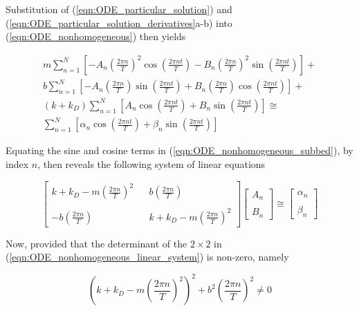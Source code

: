 \noindent Substitution of (\ref{eqn:ODE_particular_solution}) and (\ref{eqn:ODE_particular_solution_derivatives}a-b) into (\ref{eqn:ODE_nonhomogeneous}) then yields

\begin{multline}
	m\sum_{n=1}^{N} \left[-A_n\left(\frac{2\pi n}{T}\right)^2\cos\left(\frac{2\pi nt}{T}\right) - B_n\left(\frac{2\pi n}{T}\right)^2\sin\left(\frac{2\pi nt}{T}\right)\right] +\\
	b\sum_{n=1}^{N} \left[-A_n\left(\frac{2\pi n}{T}\right)\sin\left(\frac{2\pi nt}{T}\right) + B_n\left(\frac{2\pi n}{T}\right)\cos\left(\frac{2\pi nt}{T}\right)\right] +\\
	(k + k_D)\sum_{n=1}^{N} \left[A_n\cos\left(\frac{2\pi nt}{T}\right) + B_n\sin\left(\frac{2\pi nt}{T}\right)\right] \cong\\
	\sum_{n=1}^{N} \left[\alpha_n\cos\left(\frac{2\pi nt}{T}\right) + \beta_n\sin\left(\frac{2\pi nt}{T}\right)\right]
	\label{eqn:ODE_nonhomogeneous_subbed}
\end{multline}

\noindent Equating the sine and cosine terms in (\ref{eqn:ODE_nonhomogeneous_subbed}), by index $n$, then reveals the following system of linear equations

\begin{equation}
	\begin{bmatrix}
		k + k_D - m\left(\frac{2\pi n}{T}\right)^2 & {} & b\left(\frac{2\pi n}{T}\right) \\
		{} & {} & {}\\
		-b\left(\frac{2\pi n}{T}\right) & {} & k + k_D - m\left(\frac{2\pi n}{T}\right)^2
	\end{bmatrix}
	\begin{bmatrix}
		A_n \\
		{} \\
		B_n
	\end{bmatrix} \cong
	\begin{bmatrix}
		\alpha_n \\
		{} \\
		\beta_n
	\end{bmatrix}
	\label{eqn:ODE_nonhomogeneous_linear_system}
\end{equation}

\noindent Now, provided that the determinant of the $2\times 2$ in (\ref{eqn:ODE_nonhomogeneous_linear_system}) is non-zero, namely

\begin{equation}
	\left(k + k_D - m\left(\frac{2\pi n}{T}\right)^2\right)^2 + b^2\left(\frac{2\pi n}{T}\right)^2 \neq 0
	\label{eqn:ODE_nonhomogeneous_nonzero_det}
\end{equation}

